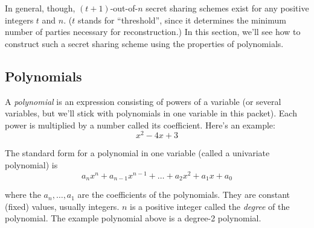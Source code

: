 \documentclass[12 pt]{article}
\newcounter{example}[section]
\begin{document}
In general, though, $(t+1)$-out-of-$n$ secret sharing schemes exist for any positive integers
$t$ and $n$.
($t$ stands for ``threshold'', since it determines the minimum number of parties necessary 
for reconstruction.)
In this section, we'll see how to construct such a secret sharing scheme using the properties 
of polynomials.

\subsection{Polynomials}

A \emph{polynomial} is an expression consisting of powers of a variable (or several variables,
but we'll stick with polynomials in one variable in this packet). Each power 
is multiplied by a number called its coefficient. Here's an example:
\[
    x^2 - 4x + 3
\]

The standard form for a polynomial in one variable (called a univariate polynomial) is 
\begin{equation}\label{eqn:std-form}
    a_n x^n + a_{n-1} x^{n-1} + \ldots + a_2 x^2 + a_1 x + a_0
\end{equation}

where the $a_n, \ldots, a_1$ are the coefficients of the polynomials. They 
are constant (fixed) values, usually integers. $n$ 
is a positive integer called the \emph{degree} of the polynomial. The example polynomial
above is a degree-2 polynomial.

\begin{center}
\end{center}
\end{document}
